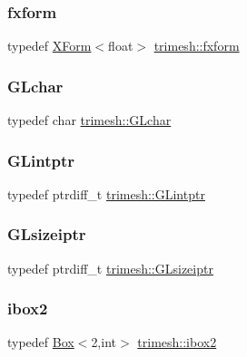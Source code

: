 \subsubsection{\texorpdfstring{fxform}{fxform}}
{\footnotesize\ttfamily typedef \hyperlink{classtrimesh_1_1XForm}{X\+Form}$<$float$>$ \hyperlink{namespacetrimesh_a6dc08ea49881bb2975b7d34e0c07faad}{trimesh\+::fxform}}

\mbox{\label{namespacetrimesh_ae0c0512592dbcadf9b11efef0409d165}} 
\subsubsection{\texorpdfstring{G\+Lchar}{GLchar}}
{\footnotesize\ttfamily typedef char \hyperlink{namespacetrimesh_ae0c0512592dbcadf9b11efef0409d165}{trimesh\+::\+G\+Lchar}}

\mbox{\label{namespacetrimesh_a77e138abc0b5c76fc39e900b4ddc2242}} 
\subsubsection{\texorpdfstring{G\+Lintptr}{GLintptr}}
{\footnotesize\ttfamily typedef ptrdiff\+\_\+t \hyperlink{namespacetrimesh_a77e138abc0b5c76fc39e900b4ddc2242}{trimesh\+::\+G\+Lintptr}}

\mbox{\label{namespacetrimesh_a81f1ae6b94117df73fad0a5577fd01a9}} 
\subsubsection{\texorpdfstring{G\+Lsizeiptr}{GLsizeiptr}}
{\footnotesize\ttfamily typedef ptrdiff\+\_\+t \hyperlink{namespacetrimesh_a81f1ae6b94117df73fad0a5577fd01a9}{trimesh\+::\+G\+Lsizeiptr}}

\mbox{\label{namespacetrimesh_a6535188633f2044f51969cc6a3c54bc3}} 
\subsubsection{\texorpdfstring{ibox2}{ibox2}}
{\footnotesize\ttfamily typedef \hyperlink{classtrimesh_1_1Box}{Box}$<$2,int$>$ \hyperlink{namespacetrimesh_a6535188633f2044f51969cc6a3c54bc3}{trimesh\+::ibox2}}

